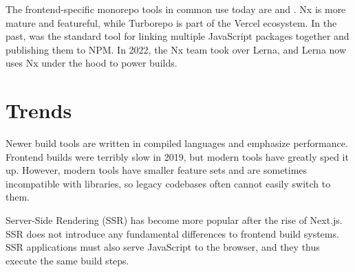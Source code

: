 \documentclass{article}
\begin{document}
The frontend-specific monorepo tools in common use today are \href{https://nx.dev/}{} and
\href{https://turbo.build/repo}{}. Nx is more mature and featureful, while Turborepo
is part of the Vercel ecosystem. In the past, \href{https://lerna.js.org/}{} was the
standard tool for linking multiple JavaScript packages together and publishing them to NPM. In 2022,
the Nx team took over Lerna, and Lerna now uses Nx under the hood to power builds.

\section{Trends}

Newer build tools are written in compiled languages and emphasize performance. Frontend builds were
terribly slow in 2019, but modern tools have greatly sped it up. However, modern tools have smaller
feature sets and are sometimes incompatible with libraries, so legacy codebases often cannot easily
switch to them.

Server-Side Rendering (SSR) has become more popular after the rise of Next.js. SSR does not
introduce any fundamental differences to frontend build systems. SSR applications must also serve
JavaScript to the browser, and they thus execute the same build steps.
\end{document}
